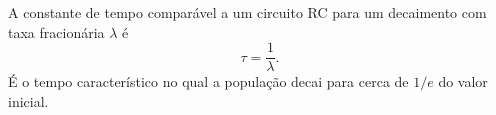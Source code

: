 A constante de tempo comparável a um circuito RC para um decaimento com taxa fracionária $\lambda$ é
\[
\tau = \frac{1}{\lambda}.
\]
É o tempo característico no qual a população decai para cerca de $1/e$ do valor inicial. 